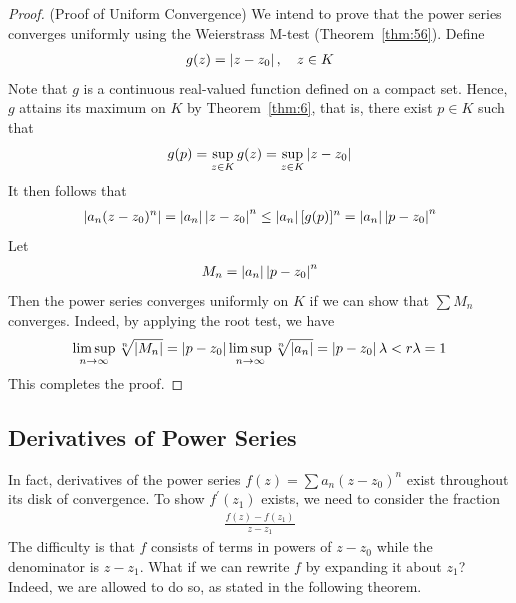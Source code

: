\documentclass[thmcnt=section, 12pt]{my-elegantbook}
\begin{document}
\begin{proof}
    (Proof of Uniform Convergence) We intend to prove that the power series converges uniformly using the Weierstrass M-test (Theorem~\ref{thm:56}). Define
    \begin{align*}
        g(z) = \left\lvert z - z_0 \right\rvert,
        \quad z \in K
    \end{align*}
    Note that $g$ is a continuous real-valued function defined on a compact set. Hence, $g$ attains its maximum on $K$ by Theorem~\ref{thm:6}, that is, there exist $p \in K$ such that 
    \begin{align*}
        g(p) = \sup_{z \in K} g(z)
        = \sup_{z \in K} \left\lvert z - z_0 \right\rvert
    \end{align*}
    It then follows that 
    \begin{align*}
        \left\lvert a_n (z - z_0)^n \right\rvert
        = \left\lvert a_n \right\rvert \left\lvert z - z_0 \right\rvert^n
        \leq \left\lvert a_n \right\rvert [g(p)]^n
        = \left\lvert a_n \right\rvert \left\lvert p - z_0 \right\rvert^n
    \end{align*}
    Let 
    \begin{align*}
        M_n = \left\lvert a_n \right\rvert \left\lvert p - z_0 \right\rvert^n
    \end{align*}
    Then the power series converges uniformly on $K$ if we can show that $\sum M_n$ converges. Indeed, by applying the root test, we have 
    \begin{align*}
        \limsup_{n \to \infty} \sqrt[n]{\left\lvert M_n \right\rvert}
        = \left\lvert p - z_0 \right\rvert \limsup_{n \to \infty} \sqrt[n]{\left\lvert a_n \right\rvert}
        = \left\lvert p - z_0 \right\rvert \lambda
        < r \lambda
        = 1
    \end{align*}
    This completes the proof.
\end{proof}


\subsection{Derivatives of Power Series}

In fact, derivatives of the power series $f(z) = \sum a_n (z - z_0)^n$ exist throughout its disk of convergence. To show $f^\prime(z_1)$ exists, we need to consider the fraction 
\begin{align*}
    \frac{f(z) - f(z_1)}{z - z_1}
\end{align*}
The difficulty is that $f$ consists of terms in powers of $z - z_0$ while the denominator is $z - z_1$. What if we can rewrite $f$ by expanding it about $z_1$? Indeed, we are allowed to do so, as stated in the following theorem.
\end{document}
